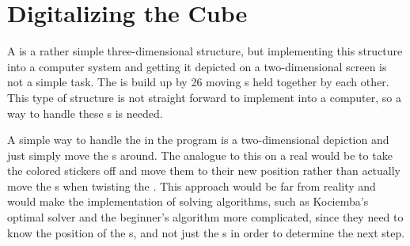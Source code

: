 \chapter{Digitalizing the Cube}
A \rubik{} is a rather simple three-dimensional structure, but implementing this structure into a computer system and getting it depicted on a two-dimensional screen is not a simple task.
The \rubik{} is build up by 26 moving \cpiece{}s held together by each other.  This type of structure is not straight forward to implement into a computer, so a way to handle these \cpiece{}s is needed.

A simple way to handle the \rubik{} in the program is a two-dimensional depiction and  just simply move the \facelet{}s around.
The analogue to this on a real \rubik{} would be to take the colored stickers off and move them to their new position rather than actually move the \cubie{}s when twisting the \rubik{}.
This approach would be far from reality and would make the implementation of solving algorithms, such as Kociemba's optimal solver and the beginner's algorithm more complicated, since they need to know the position of the \cpiece{}s, and not just the \facelet{}s in order to determine the next step.

